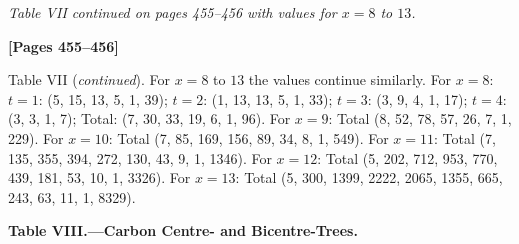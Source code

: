 \documentclass[11pt,a4paper]{book}
\begin{document}
\textit{Table VII continued on pages 455--456 with values for $x = 8$ to $13$.}

\newpage
\textbf{[Pages 455--456]}

Table VII (\textit{continued}). For $x = 8$ to $13$ the values continue similarly.
For $x = 8$: $t = 1$: (5, 15, 13, 5, 1, 39); $t = 2$: (1, 13, 13, 5, 1, 33);
$t = 3$: (3, 9, 4, 1, 17); $t = 4$: (3, 3, 1, 7); Total: (7, 30, 33, 19, 6, 1, 96).
For $x = 9$: Total (8, 52, 78, 57, 26, 7, 1, 229).
For $x = 10$: Total (7, 85, 169, 156, 89, 34, 8, 1, 549).
For $x = 11$: Total (7, 135, 355, 394, 272, 130, 43, 9, 1, 1346).
For $x = 12$: Total (5, 202, 712, 953, 770, 439, 181, 53, 10, 1, 3326).
For $x = 13$: Total (5, 300, 1399, 2222, 2065, 1355, 665, 243, 63, 11, 1, 8329).

\begin{center}
\textbf{Table VIII.---Carbon Centre- and Bicentre-Trees.}
\end{center}
\end{document}
